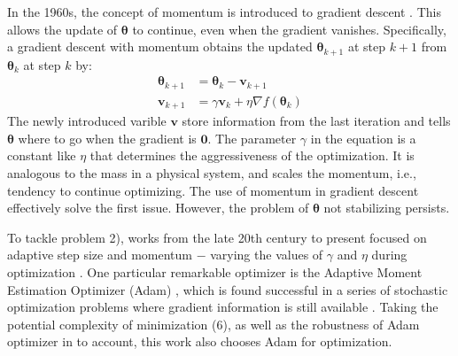 \documentclass[conference]{IEEEtran}
\begin{document}
In the 1960s, the concept of momentum is introduced to gradient descent \cite{GDM}. 
This allows the update of $\boldsymbol{\theta}$ to continue, even when the 
gradient vanishes. Specifically, a gradient descent with momentum obtains the updated  
$\boldsymbol{\theta}_{k+1}$ at step $k+1$ from $\boldsymbol{\theta}_{k}$ at step $k$ by:
\begin{align*}
\boldsymbol{\theta}_{k+1} &= \boldsymbol{\theta}_k - \mathbf{v}_{k+1} \\
\mathbf{v}_{k+1} &= \gamma \mathbf{v}_k + \eta \nabla f(\boldsymbol{\theta}_k)
\end{align*}
The newly introduced varible $\mathbf{v}$ store information from the last 
iteration and tells $\boldsymbol{\theta}$ where to go when the gradient is $\mathbf{0}$. 
The parameter $\gamma$ in the equation is a constant like $\eta$ that 
determines the aggressiveness of the optimization. It is analogous to 
the mass in a physical system, and scales the momentum, i.e., tendency 
to continue optimizing. The use of momentum in gradient descent effectively 
solve the first issue. However, the problem of $\boldsymbol{\theta}$ not 
stabilizing persists.

To tackle problem 2), works from the late 20th century to present focused on 
adaptive step size and momentum $-$ varying the values of $\gamma$ and 
$\eta$ during optimization \cite{Jacobs}\cite{Sutton}\cite{RPROP}\cite{AdaGrad}\cite{Adam}. 
One particular remarkable optimizer is the Adaptive Moment Estimation Optimizer (Adam) \cite{Adam}, 
which is found successful in a series of stochastic optimization problems 
where gradient information is still available \cite{Transformer}\cite{ViT}\cite{StyleGAN}. 
Taking the potential complexity of minimization (6), as well as the robustness 
of Adam optimizer in to account, this work also chooses Adam for optimization.
\end{document}
